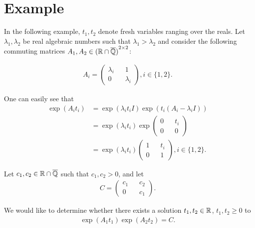 \section{Example}

In the following example, $t_{1},t_{2}$ denote fresh variables ranging over the reals.
Let $\lambda_{1}, \lambda_{2}$ be real algebraic numbers such that $\lambda_{1} > \lambda_{2}$ and consider the following commuting matrices $A_{1}, A_{2} \in {(\mathbb{R}\cap \overline{\mathbb{Q}})}^{2 \times 2}$:

\begin{align*}
A_{i} = \begin{pmatrix} \lambda_{i} && 1 \\ 0 && \lambda_{i} \end{pmatrix}, i \in \lbrace 1, 2 \rbrace .
\end{align*}

One can easily see that
\begin{align*}
\exp(A_{i} t_{i}) &= \exp(\lambda_{i} t_{i} I) \exp(t_{i} (A_{i} - \lambda_{i} I)) \\
&= \exp(\lambda_{i} t_{i})
\exp \begin{pmatrix} 0 && t_{i} \\ 0 && 0 \end{pmatrix} \\
&= \exp (\lambda_{i} t_{i})
\begin{pmatrix} 1 && t_{i} \\ 0 && 1 \end{pmatrix}, i \in \lbrace 1, 2 \rbrace .
\end{align*}

Let $c_{1}, c_{2} \in \mathbb{R} \cap \overline{\mathbb{Q}}$ such that $c_{1}, c_{2} > 0$, and let
\begin{align*}
C = \begin{pmatrix} c_{1} && c_{2} \\ 0 && c_{1} \end{pmatrix} .
\end{align*}

We would like to determine whether there exists a solution $t_{1}, t_{2} \in \mathbb{R}$, $t_{1}, t_{2} \geq 0$ to
\begin{align*}
\exp(A_{1} t_{1}) \exp(A_{2} t_{2}) = C.
\end{align*}

